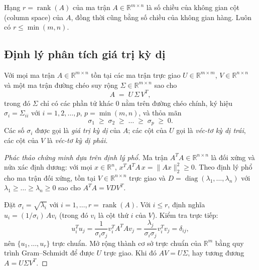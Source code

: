 \begin{definition}\label{def:rank}
Hạng $r = \operatorname{rank}(A)$ của ma trận $A \in \mathbb{R}^{m\times n}$
là số chiều của không gian cột (column space) của $A$, đồng thời cũng bằng số
chiều của không gian hàng. Luôn có $r \le \min(m, n)$.
\end{definition}

\subsection{Định lý phân tích giá trị kỳ dị}\label{subsec:svd-theorem}

\begin{theorem}\label{thm:svd}
Với mọi ma trận $A \in \mathbb{R}^{m\times n}$ tồn tại các ma trận trực giao
$U \in \mathbb{R}^{m\times m}$, $V \in \mathbb{R}^{n\times n}$ và một ma trận
đường chéo suy rộng $\Sigma \in \mathbb{R}^{m\times n}$ sao cho
\begin{equation}\label{eq:svd}
    A \;=\; U\, \Sigma\, V^T,
\end{equation}
trong đó $\Sigma$ chỉ có các phần tử khác $0$ nằm trên đường chéo chính,
ký hiệu $\sigma_i = \Sigma_{ii}$ với $i = 1, 2, \dots, p$, $p = \min(m, n)$,
và thỏa mãn
\[
    \sigma_1 \;\ge\; \sigma_2 \;\ge\; \dots \;\ge\; \sigma_p \;\ge\; 0.
\]
Các số $\sigma_i$ được gọi là \emph{giá trị kỳ dị} của $A$; các cột của $U$
gọi là \emph{véc-tơ kỳ dị trái}, các cột của $V$ là \emph{véc-tơ kỳ dị phải}.
\end{theorem}

\begin{proof}[Phác thảo chứng minh dựa trên định lý phổ]
Ma trận $A^T A \in \mathbb{R}^{n\times n}$ là đối xứng và nửa xác định dương:
với mọi $x \in \mathbb{R}^n$, $x^T A^T A\, x = \|Ax\|_2^2 \ge 0$. Theo định lý
phổ cho ma trận đối xứng, tồn tại $V \in \mathbb{R}^{n\times n}$ trực giao và
$D = \operatorname{diag}(\lambda_1, \dots, \lambda_n)$ với
$\lambda_1 \ge \dots \ge \lambda_n \ge 0$ sao cho $A^T A = V D V^T$.

Đặt $\sigma_i = \sqrt{\lambda_i}$ với $i = 1, \dots, r = \operatorname{rank}(A)$.
Với $i \le r$, định nghĩa $u_i = (1/\sigma_i)\, A v_i$ (trong đó $v_i$ là cột
thứ $i$ của $V$). Kiểm tra trực tiếp:
\[
    u_i^T u_j = \frac{1}{\sigma_i \sigma_j} v_i^T A^T A v_j
              = \frac{\lambda_j}{\sigma_i\sigma_j} v_i^T v_j = \delta_{ij},
\]
nên $\{u_1, \dots, u_r\}$ trực chuẩn. Mở rộng thành cơ sở trực chuẩn của
$\mathbb{R}^m$ bằng quy trình Gram--Schmidt để được $U$ trực giao. Khi đó
$A V = U \Sigma$, hay tương đương $A = U\Sigma V^T$.
\end{proof}


